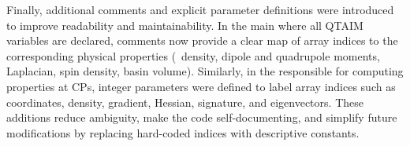 \vspace*{1em}%
Finally, additional comments and explicit parameter definitions were introduced
to improve readability and maintainability. In the main \module where all
\gls{QTAIM} variables are declared, comments now provide a clear map of array
indices to the corresponding physical properties (\eg\ density, dipole and
quadrupole moments, Laplacian, spin density, basin volume).
Similarly, in the \module responsible for computing properties at \glspl{CP},
integer parameters were defined to label array indices such as
coordinates, density, gradient, Hessian, signature, and eigenvectors. These
additions reduce ambiguity, make the code self-documenting, and simplify future
modifications by replacing hard-coded indices with descriptive constants.

